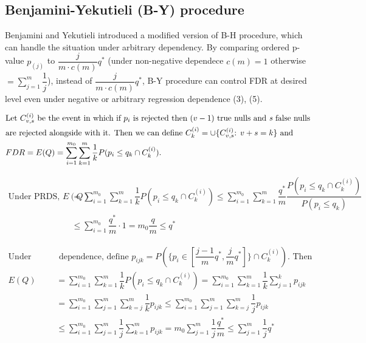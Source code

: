 \documentclass[a4paper, 11pt, oneside]{article}
\begin{document}
\subsection{Benjamini-Yekutieli (B-Y) procedure}
Benjamini and Yekutieli introduced a modified version of B-H procedure, which can handle the situation under arbitrary dependency. By comparing ordered p-value $p_{(j)}$ to $\dfrac{j}{m \cdot c(m)}q^*$ (under non-negative dependece $c(m)=1$ otherwise $=\sum_{j=1}^m \dfrac{1}{j}$), instead of $\dfrac{j}{m \cdot c(m)}q^*$, B-Y procedure can control FDR at desired level even under negative or arbitrary regression dependence (3), (5).

\begin{equation}
\begin{aligned}\label{proof-by1}
& \text{Let } C_{v, s}^{(i)} \text{ be the event in which if } p_i \text{ is rejected then } (v-1) \text{ true nulls and \textit{s} false nulls}\\
& \text{are rejected alongside with it. Then we can define } C_k^{(i)}=\cup \{C_{v,s}^{(i)} \text{: } v+s=k \} \text{ and } \\
& FDR=E(Q)=\sum_{i=1}^{m_0} \sum_{k=1}^m \dfrac{1}{k}P(p_i \leq q_k \cap C_k^{(i)}).\\
\end{aligned}
\end{equation}

\begin{equation}
\begin{aligned}\label{proof-by2}
\text{Under PRDS, } E(Q)&=\sum_{i=1}^{m_0} \sum_{k=1}^m \dfrac{1}{k}P(p_i \leq q_k \cap C_k^{(i)}) \leq \sum_{i=1}^{m_0} \sum_{k=1}^m \dfrac{q^*}{m} \dfrac{P(p_i \leq q_k \cap C_k^{(i)})}{P(p_i \leq q_k)}\\
& \leq \sum_{i=1}^{m_0} \dfrac{q^*}{m} \cdot 1 = m_0 \dfrac{q}{m} \leq q^*
\end{aligned}
\end{equation}

\begin{equation}
\begin{aligned}\label{proof-by3}
\text{Under arbitraty} &\text{ dependence, define } p_{ijk}=P(\{ p_i \in [\dfrac{j-1}{m}q^*, \dfrac{j}{m}q^*]\} \cap C_k^{(i)}). \text{ Then}\\ 
E(Q)&=\sum_{i=1}^{m_0} \sum_{k=1}^m \dfrac{1}{k}P(p_i \leq q_k \cap C_k^{(i)}) = \sum_{i=1}^{m_0} \sum_{k=1}^{m} \dfrac{1}{k} \sum_{j=1}^{k} p_{ijk}\\
& = \sum_{i=1}^{m_0} \sum_{j=1}^{m} \sum_{k=j}^{m} \dfrac{1}{k}p_{ijk} \leq \sum_{i=1}^{m_0} \sum_{j=1}^{m} \sum_{k=j}^{m} \dfrac{1}{j}p_{ijk} \\
& \leq \sum_{i=1}^{m_0} \sum_{j=1}^{m} \dfrac{1}{j} \sum_{k=1}^{m} p_{ijk} = m_0 \sum_{j=1}^{m} \dfrac{1}{j} \dfrac{q^*}{m} \leq \sum_{j=1}^m \dfrac{1}{j} q^*
\end{aligned}
\end{equation}
\end{document}
